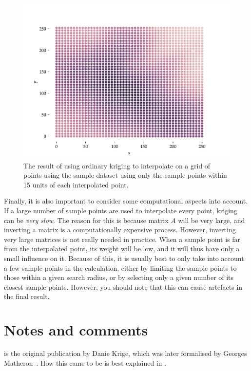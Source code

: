 \begin{figure}[htbp]
\centering
\includegraphics[width=\linewidth]{figs/interpolation}
\caption{The result of using ordinary kriging to interpolate on a grid of points using the sample dataset using only the sample points within 15 units of each interpolated point.}%
\label{fig:interpolation}
\end{figure}

Finally, it is also important to consider some computational aspects into account.
If a large number of sample points are used to interpolate every point, kriging can be \emph{very slow}.
The reason for this is because matrix \(A\) will be very large, and inverting a matrix is a computationally expensive process.
However, inverting very large matrices is not really needed in practice.
When a sample point is far from the interpolated point, its weight will be low, and it will thus have only a small influence on it.
Because of this, it is usually best to only take into account a few sample points in the calculation, either by limiting the sample points to those within a given search radius, or by selecting only a given number of its closest sample points.
However, you should note that this can cause artefacts in the final result.

%
\section{Notes and comments}

\citet{Krige51} is the original publication by Danie Krige, which was later formalised by Georges Matheron~\citep{Matheron62,Matheron65}.
How this came to be is best explained in \citet{cressie93}.

